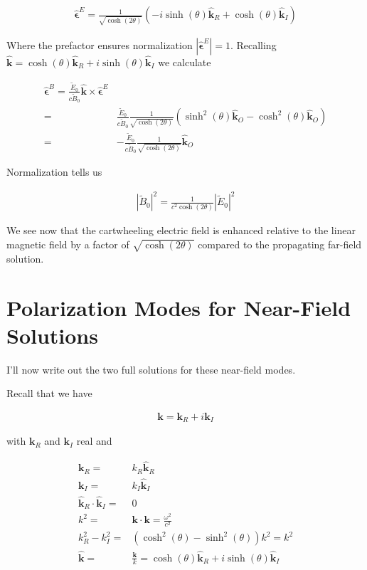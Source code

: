 \documentclass[12pt]{article}
\newcommand{\ep}{\epsilon}
\renewcommand{\vec}[1]{\boldsymbol{#1}}
\newcommand{\unitvec}[1]{\hat{\boldsymbol{#1}}}
\begin{document}
\begin{align}
\unitvec{\ep}^E = \frac{1}{\sqrt{\cosh(2\theta)}} \left(-i\sinh(\theta)\unitvec{k}_R + \cosh(\theta)\unitvec{k}_I\right)
\end{align}

Where the prefactor ensures normalization $\left|\unitvec{\ep}^E\right| = 1$.
Recalling $\unitvec{k} = \cosh(\theta)\unitvec{k}_R + i \sinh(\theta)\unitvec{k}_I$ we calculate

\begin{align}
\unitvec{\ep}^B = \frac{\tilde{E}_0}{c\tilde{B}_0} \unitvec{k}\times \unitvec{\ep}^E\\
=& \frac{\tilde{E}_0}{c\tilde{B}_0} \frac{1}{\sqrt{\cosh(2\theta)}} \left(\sinh^2(\theta)\unitvec{k}_O -\cosh^2(\theta)\unitvec{k}_O\right)\\
=& - \frac{\tilde{E}_0}{c\tilde{B}_0} \frac{1}{\sqrt{\cosh(2\theta)}} \unitvec{k}_O
\end{align}

Normalization tells us

\begin{align}
|\tilde{B}_0|^2 = \frac{1}{c^2\cosh(2\theta)} |\tilde{E}_0|^2
\end{align}

We see now that the cartwheeling electric field is enhanced relative to the linear magnetic field by a factor of $\sqrt{\cosh(2\theta)}$ compared to the propagating far-field solution.

\section{Polarization Modes for Near-Field Solutions}

I'll now write out the two full solutions for these near-field modes.

Recall that we have

\begin{align}
\vec{k} = \vec{k}_R + i \vec{k}_I
\end{align}

with $\vec{k}_R$ and $\vec{k}_I$ real and

\begin{align}
\vec{k}_R =& k_R\unitvec{k}_R\\
\vec{k}_I =& k_I\unitvec{k}_I\\
\unitvec{k}_R\cdot\unitvec{k}_I =&0\\
k^2 =& \vec{k}\cdot\vec{k} = \frac{\omega^2}{c^2}\\
k_R^2 - k_I^2 =& (\cosh^2(\theta) - \sinh^2(\theta))k^2 = k^2\\
\unitvec{k} =& \frac{\vec{k}}{k} = \cosh(\theta)\unitvec{k}_R + i\sinh(\theta)\unitvec{k}_I
\end{align}
\end{document}
